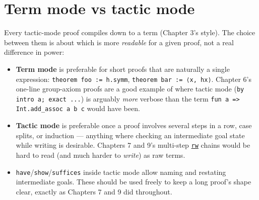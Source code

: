 \section{Term mode vs tactic mode}\label{sec:12-working-efficiently:04-term-vs-tactic-mode:1}

Every tactic-mode proof compiles down to a term (Chapter 3's style). The choice between them is about which is more \emph{readable} for a given proof, not a real difference in power:

\begin{itemize}
\tightlist
\item
  \textbf{Term mode} is preferable for short proofs that are naturally a single expression: \texttt{theorem foo := h.symm}, \texttt{theorem bar := ⟨x, hx⟩}. Chapter 6's one-line group-axiom proofs are a good example of where tactic mode (\texttt{by intro a; exact ...}) is arguably \emph{more} verbose than the term \texttt{fun a => Int.add\_\allowbreak{}assoc a b c} would have been.
\item
  \textbf{Tactic mode} is preferable once a proof involves several steps in a row, case splits, or induction --- anything where checking an intermediate goal state while writing is desirable. Chapters 7 and 9's multi-step \href{https://lean-lang.org/doc/reference/latest/Tactic-Proofs/Tactic-Reference/}{\texttt{rw}} chains would be hard to read (and much harder to \emph{write}) as raw terms.
\item
  \texttt{have}/\texttt{show}/\texttt{suffices} inside tactic mode allow naming and restating intermediate goals. These should be used freely to keep a long proof's shape clear, exactly as Chapters 7 and 9 did throughout.
\end{itemize}
